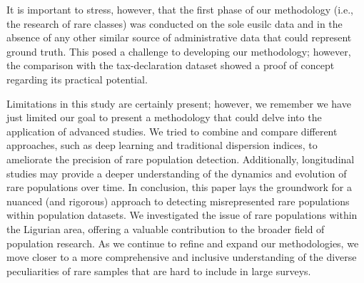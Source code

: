 It is important to stress, however, that the first phase of our methodology (i.e., the research of rare classes) was conducted on the sole \gls{eusilc} data and in the absence of any other similar source of administrative data that could represent ground truth.
This posed a challenge to developing our methodology; however, the comparison with the tax-declaration dataset showed a proof of concept regarding its practical potential.



Limitations in this study are certainly present; however, we remember we have just limited our goal to present a methodology that could delve into the application of advanced studies.
We tried to combine and compare different approaches, such as deep learning and traditional dispersion indices, to ameliorate the precision of rare population detection.
Additionally, longitudinal studies may provide a deeper understanding of the dynamics and evolution of rare populations over time.
In conclusion, this paper lays the groundwork for a nuanced (and rigorous) approach to detecting misrepresented rare populations within population datasets.
We investigated the issue of rare populations within the Ligurian area, offering a valuable contribution to the broader field of population research. 
As we continue to refine and expand our methodologies, we move closer to a more comprehensive and inclusive understanding of the diverse peculiarities of rare samples that are hard to include in large surveys.


